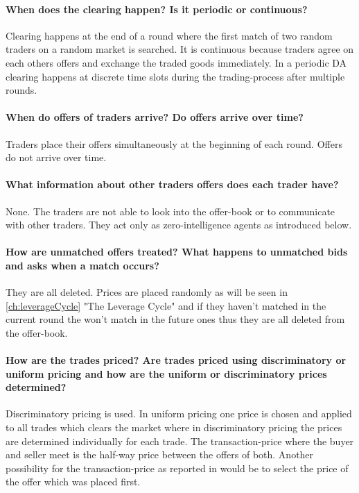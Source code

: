 \documentclass[../Bachelorarbeit.tex]{subfiles}
\begin{document}
\paragraph{When does the clearing happen? Is it periodic or continuous?} Clearing happens at the end of a round where the first match of two random traders on a random market is searched. It is continuous because traders agree on each others offers and exchange the traded goods immediately. In a periodic DA clearing happens at discrete time slots during the trading-process after multiple rounds.

\paragraph{When do offers of traders arrive? Do offers arrive over time?} Traders place their offers simultaneously at the beginning of each round. Offers do not arrive over time.

\paragraph{What information about other traders offers does each trader have?} None. The traders are not able to look into the offer-book or to communicate with other traders. They act only as \gls{zero-intelligence agents} as introduced below.

\paragraph{How are unmatched offers treated? What happens to unmatched bids and asks when a match occurs?} They are all deleted. Prices are placed randomly as will be seen in \ref{ch:leverageCycle} "The Leverage Cycle" and if they haven't matched in the current round the won't match in the future ones thus they are all deleted from the offer-book.

\paragraph{How are the trades priced? Are trades priced using discriminatory or uniform pricing and how are the uniform or discriminatory prices determined?} Discriminatory pricing is used. In uniform pricing one price is chosen and applied to all trades which clears the market where in discriminatory pricing the prices are determined individually for each trade. The \gls{transaction-price} where the buyer and seller meet is the half-way price between the offers of both. Another possibility for the transaction-price as reported in \cite{GodeSunder1993} would be to select the price of the offer which was placed first.
\end{document}
